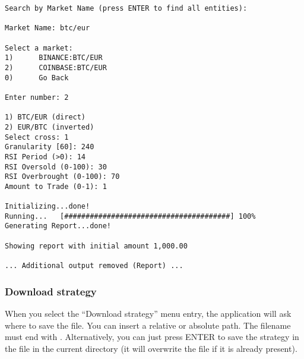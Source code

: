 \begin{verbatim}
Search by Market Name (press ENTER to find all entities):

Market Name: btc/eur

Select a market:
1)      BINANCE:BTC/EUR
2)      COINBASE:BTC/EUR
0)      Go Back

Enter number: 2

1) BTC/EUR (direct)
2) EUR/BTC (inverted)
Select cross: 1
Granularity [60]: 240
RSI Period (>0): 14
RSI Oversold (0-100): 30
RSI Overbrought (0-100): 70
Amount to Trade (0-1): 1

Initializing...done!
Running...   [#######################################] 100%
Generating Report...done!

Showing report with initial amount 1,000.00

... Additional output removed (Report) ...
\end{verbatim}

\subsubsection{Download strategy}

When you select the ``Download strategy'' menu entry, the application will ask
where to save the file. You can insert a relative or absolute path. The filename
must end with . Alternatively, you can just press ENTER to save the
strategy in the  file in the current directory (it will
overwrite the file if it is already present).
